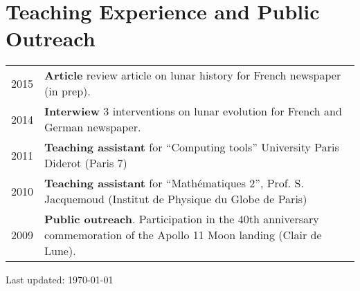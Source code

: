 \documentclass[11pt,fullpage]{article}
\begin{document}
\section*{Teaching Experience and Public Outreach}

\begin{longtable}{p{0.7in}|p{5.5in}}

	2015 & \textbf{Article} review article on lunar history for French newspaper (in prep). \\
	2014 & \textbf{Interwiew} 3 interventions on lunar evolution for French and German newspaper. \\

	2011 & \textbf{Teaching assistant} for ``Computing tools'' University Paris Diderot (Paris 7) \\ 

	2010 & \textbf{Teaching assistant} for ``Mathématiques 2'', Prof. S. Jacquemoud (Institut de Physique
du Globe de Paris) \\ 

	2009 & \textbf{Public outreach}. Participation in the 40th anniversary commemoration of the Apollo 11
Moon landing (Clair de Lune). \\

\end{longtable}


\bigskip
\begin{center}
  \begin{footnotesize}
    Last updated: \today
  \end{footnotesize}
\end{center}

\end{document}
